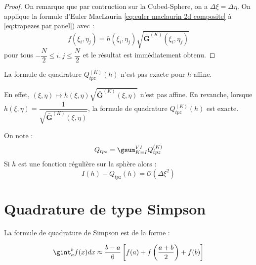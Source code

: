 \begin{proof}
On remarque que par contruction sur la Cubed-Sphere, on a $\Delta \xi = \Delta \eta$.
On applique la formule d'Euler MacLaurin \eqref{eq:euler maclaurin 2d composite} à \eqref{eq:trapezes par panel}) avec :
\begin{equation}
f(\xi_i,\eta_j) = h(\xi_i, \eta_j) \sqrt{\mathbf{\bar{G}}^{(K)}(\xi_i, \eta_j)} 
\end{equation}
pour tous $-\dfrac{N}{2} \leq i,j \leq \dfrac{N}{2}$ et le résultat est immédiatement obtenu.
\end{proof}

\begin{remarque}
La formule de quadrature $Q_{tpz}^{(K)}(h)$ n'est pas exacte pour $h$ affine.

En effet, $(\xi,\eta) \mapsto h(\xi, \eta) \sqrt{\mathbf{\bar{G}}^{(K)}(\xi, \eta)}$ n'est pas affine.
En revanche, lorsque $h(\xi,\eta)=\dfrac{1}{\sqrt{\mathbf{\bar{G}}^{(K)}(\xi, \eta)}}$, la formule de quadrature $Q_{tpz}^{(K)}(h)$ est exacte.
\end{remarque}

\begin{corollaire}
On note :
\begin{equation}
Q_{tpz}=\gsum_{K=I}^{VI} Q_{tpz}^{(K)}
\end{equation}
Si $h$ est une fonction régulière sur la sphère alors :
\begin{equation}
I(h) - Q_{tpz}(h) = \mathcal{O} \left( \Delta \xi^2 \right)
\end{equation}
\label{prop:consistance tpz}
\end{corollaire}



















\section{Quadrature de type Simpson}

La formule de quadrature de Simpson est de la forme :

\begin{equation}
\gint_a^b f(x)dx \approx \dfrac{b-a}{6} \left[ f(a)+f\left(\dfrac{a+b}{2}\right) + f(b) \right]
\end{equation}

